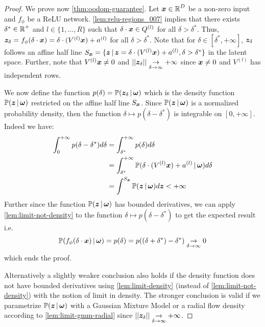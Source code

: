 \begin{proof}
We prove now \cref{thm:oodom-guarantee}. Let $\bm{x} \in \operatorname{\mathbb{R}}^D $ be a non-zero input and $f_{\phi}$ be a ReLU network. \cref{lem:relu-regions_007} implies that there exists $\delta^* \in \operatorname{\mathbb{R}}^{+}$ and $l \in \{1,..., R\}$ such that $\delta \cdot \bm{x} \in Q^{(l)}$ for all $\delta > \delta^*$. Thus, $\bm{z}_{\delta} = f_{\phi}(\delta \cdot \bm{x}) = \delta \cdot (V^{(l)} \bm{x}) + a^{(l)}$ for all $\delta > \delta^*$. Note that for $\delta\in [\delta^*, +\infty]$,  $\bm{z}_{\delta}$ follows an affine half line $S_{\bm{x}} = \{\bm{z} \,|\, \bm{z} = \delta \cdot (V^{(l)} \bm{x}) + a^{(l)}, \delta > \delta^* \}$ in the latent space. Further, note that $V^{(l)}\bm{x} \neq 0$ and $|| \bm{z}_\delta|| \underset{\delta \rightarrow \infty}{\rightarrow} + \infty$ since $\bm{x} \neq 0$ and $V^{(l)}$ has independent rows.

We now define the function $p(\delta)=\mathbb{P}(\bm{z}_{\delta} \,|\, \bm{\omega})$ which is the density function $\mathbb{P}(\bm{z} \,|\, \bm{\omega})$ restricted on the affine half line $S_{\bm{x}}$. Since $\mathbb{P}(\bm{z} \,|\, \bm{\omega})$ is a normalized probability density, then the function $\delta \mapsto p(\delta - \delta^*)$ is integrable on $[0, +\infty]$. Indeed we have:
\begin{align*}
    \int_{0}^{+\infty} p(\delta - \delta^*) d\delta &= \int_{\delta^*}^{+\infty} p(\delta) d\delta \\
    &= \int_{\delta^*}^{+\infty} \mathbb{P}(\delta \cdot (V^{(l)} \bm{x}) + a^{(l)} \,|\, \bm{\omega}) d\delta\\
    &= \int^{S_{\bm{x}}} \mathbb{P}(\bm{z} \,|\, \bm{\omega}) d\bm{z} < +\infty
\end{align*}
Further since the function $\mathbb{P}(\bm{z} \,|\, \bm{\omega})$ has bounded derivatives, we can apply  \cref{lem:limit-not-density} to the function $\delta \mapsto p(\delta - \delta^*)$ to get the expected result i.e.
\begin{align*}
    \mathbb{P}(f_{\phi}(\delta \cdot \bm{x}) \,|\, \bm{\omega}) = p(\delta) = p((\delta + \delta^*) - \delta^*) \underset{\delta \rightarrow \infty}{\rightarrow} 0
\end{align*}
which ends the proof.

Alternatively a slightly weaker conclusion also holds if the density function does not have bounded derivatives using \cref{lem:limit-density} (instead of \cref{lem:limit-not-density}) with the notion of limit in density. The stronger conclusion is valid if we parametrize $\mathbb{P}(\bm{z} \,|\, \bm{\omega})$ with a Gaussian Mixture Model or a radial flow density according to \cref{lem:limit-gmm-radial} since $|| \bm{z}_\delta|| \underset{\delta \rightarrow \infty}{\rightarrow} + \infty$.
\end{proof}

